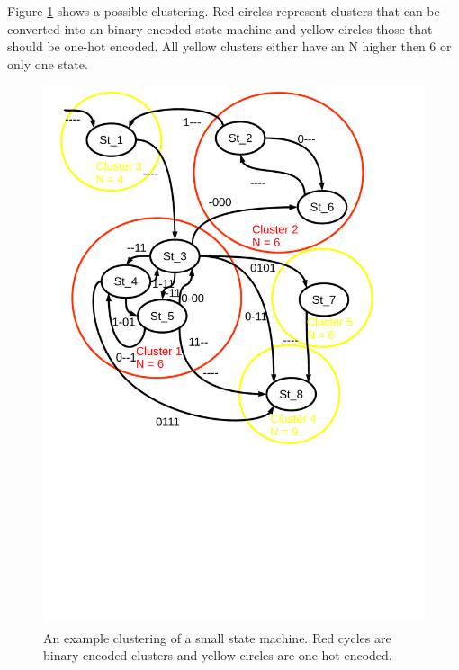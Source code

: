 Figure \ref{img:state_chart} shows a possible clustering. Red circles represent clusters that can be converted into an binary encoded state machine and yellow circles those that should be one-hot encoded.
All yellow clusters either have an N higher then 6 or only one state. \\

\begin{figure}[h]
	\centering
	\includegraphics[scale=0.65, trim=400 250 400 0] {images/state_chart.pdf}
	\caption{An example clustering of a small state machine. Red cycles are binary encoded clusters and yellow circles are one-hot encoded.}
	\label{img:state_chart}
\end{figure}

